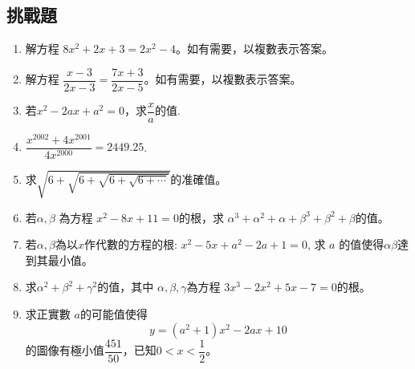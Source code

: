 \documentclass[12pt]{article}
\begin{document}
    \subsection*{挑戰題}
    \begin{enumerate}
        \item 解方程 $8x^2+2x+3=2x^2-4$。如有需要，以複數表示答案。
        \item 解方程 $\dfrac{x-3}{2x-3}=\dfrac{7x+3}{2x-5}$。如有需要，以複數表示答案。
        \item 若$x^2-2ax+a^2=0$，求$\dfrac{x}{a}$的值.
        \item $\dfrac{x^{2002}+4x^{2001}}{4x^{2000}}=2449.25$.
        \item 求$\sqrt{6+\sqrt{6+\sqrt{6+\sqrt{6+\cdots}}}}$的准確值。
        \item 若$\alpha,\beta$ 為方程 $x^2-8x+11=0$的根，求 $\alpha^3+\alpha^2+\alpha+\beta^3+\beta^2+\beta$的值。
        \item 若$\alpha,\beta$為以$x$作代數的方程的根: $x^2-5x+a^2-2a+1=0$, 求 $a$ 的值使得$\alpha\beta$達到其最小值。
        \item 求$\alpha^2+\beta^2+\gamma^2$的值，其中 $\alpha,\beta,\gamma$為方程 $3x^3-2x^2+5x-7=0$的根。
        \item 求正實數 $a$的可能值使得$$y=(a^2+1)x^2-2ax+10$$的圖像有極小值$\dfrac{451}{50}$，已知$0<x<\dfrac{1}{2}$。
    \end{enumerate}
\end{document}
